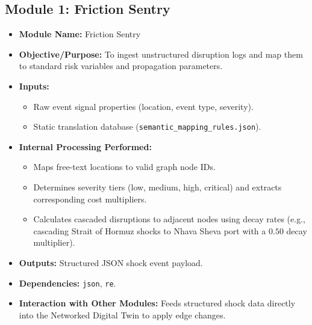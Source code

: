\subsection[Module 1: Friction Sentry]{Module 1: Friction Sentry}
\begin{itemize}
    \item \textbf{Module Name:} Friction Sentry
    \item \textbf{Objective/Purpose:} To ingest unstructured disruption logs and map them to standard risk variables and propagation parameters.
    \item \textbf{Inputs:}
    \begin{itemize}
        \item Raw event signal properties (location, event type, severity).
        \item Static translation database (\texttt{semantic\_mapping\_rules.json}).
    \end{itemize}
    \item \textbf{Internal Processing Performed:}
    \begin{itemize}
        \item Maps free-text locations to valid graph node IDs.
        \item Determines severity tiers (low, medium, high, critical) and extracts corresponding cost multipliers.
        \item Calculates cascaded disruptions to adjacent nodes using decay rates (e.g., cascading Strait of Hormuz shocks to Nhava Sheva port with a $0.50$ decay multiplier).
    \end{itemize}
    \item \textbf{Outputs:} Structured JSON shock event payload.
    \item \textbf{Dependencies:} \texttt{json}, \texttt{re}.
    \item \textbf{Interaction with Other Modules:} Feeds structured shock data directly into the Networked Digital Twin to apply edge changes.
\end{itemize}

